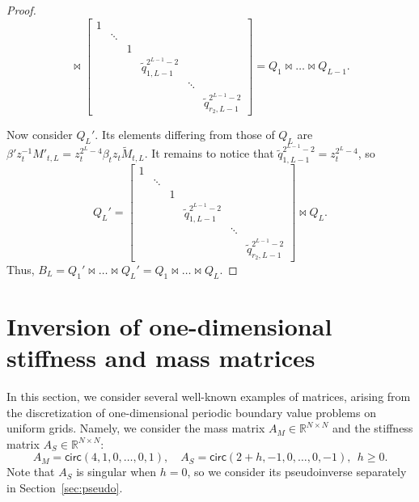 \documentclass[a4paper]{article}
\newcommand{\LL}{L}
\newcommand{\mass}{A_M}
\newcommand{\MMother}{\widetilde{M}}
\newcommand{\bbeta}{\beta'}
\newcommand{\lap}{A_S}
\newcommand{\qq}{\widetilde{q}}
\begin{document}
\begin{proof}
\[\Join
\begin{bmatrix}
    1 &        &   &                         &        & \\
      & \ddots &   &                         &        & \\
      &        & 1 &                         &        & \\
      &        &   & \qq_{1,\LL-1}^{2^{\LL-1}-2}             &        & \\
      &        &   &                         & \ddots & \\
      &        &   &                         &        & \qq_{r_2,\LL-1}^{2^{\LL-1}-2}
\end{bmatrix}
=
Q_1\Join \dots \Join Q_{\LL-1}.
\]

Now consider $Q_{\LL}'$.
Its elements differing from those of $Q_L$ are 
$\bbeta z_t^{-1} M'_{t,\LL} = z_t^{2^\LL-4} \beta_t z_t \MMother_{t,\LL}$.
It remains to notice that $\qq_{1,\LL-1}^{2^{\LL-1}-2} = z_t^{2^\LL-4}$, so
\[
Q_{\LL}' = 
\begin{bmatrix}
    1 &        &   &                         &        & \\
      & \ddots &   &                         &        & \\
      &        & 1 &                         &        & \\
      &        &   & \qq_{1,\LL-1}^{2^{\LL-1}-2}             &        & \\
      &        &   &                         & \ddots & \\
      &        &   &                         &        & \qq_{r_2,\LL-1}^{2^{\LL-1}-2}
\end{bmatrix}
\Join
Q_{\LL}.
\]
Thus, $B_L = Q_1'\Join \dots \Join Q_{\LL}' = Q_1 \Join \dots \Join Q_{\LL}$.
\end{proof}








\section{Inversion of one-dimensional stiffness and mass matrices} \label{sec:examples}

In this section, we consider several well-known examples of matrices, arising from the discretization of one-dimensional periodic boundary value problems on uniform grids.
Namely, we consider the mass matrix $\mass\in \mathbb{R}^{N \times N}$ and the stiffness matrix $\lap\in \mathbb{R}^{N \times N}$:
\[
   \mass = \mathsf{circ}(4,1,0,\dots,0,1), \quad\lap = \mathsf{circ}(2+h,-1,0,\dots,0,-1),~~h \geq 0.
\]
Note that $\lap$ is singular when $h=0$, so we consider its pseudoinverse separately in Section~\ref{sec:pseudo}.
\end{document}
